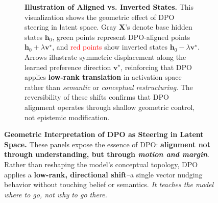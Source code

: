 \begin{figure}[htbp!]
\begin{subfigure}[t]{0.32\textwidth}
{    \textbf{Illustration of Aligned vs. Inverted States.} 
    This visualization shows the geometric effect of DPO steering in latent space. Gray \textbf{X}’s denote base hidden states \( \mathbf{h}_0 \), \textcolor{green!50!black}{green points} represent DPO-aligned points \( \mathbf{h}_0 + \lambda \mathbf{v}^\star \), and \textcolor{red}{red points} show inverted states \( \mathbf{h}_0 - \lambda \mathbf{v}^\star \). Arrows illustrate symmetric displacement along the learned preference direction \( \mathbf{v}^\star \), reinforcing that DPO applies \textbf{low-rank translation} in activation space rather than \emph{semantic} or \emph{conceptual restructuring}. The reversibility of these shifts confirms that DPO alignment operates through shallow geometric control, not epistemic modification.
}
    \label{fig:steering-3d}
\end{subfigure}

\vspace{-2mm}
\caption{
\textbf{Geometric Interpretation of DPO as Steering in Latent Space.}
These panels expose the essence of DPO: \textbf{alignment not through understanding, but through \emph{motion and margin}}. Rather than reshaping the model’s conceptual topology, DPO applies a \textbf{low-rank, directional shift}--a single vector nudging behavior without touching belief or semantics. 
\emph{It teaches the model where to go, not why to go there.}
}
\label{fig:combined-dpo-steering}
\vspace{-3mm}
\end{figure}
